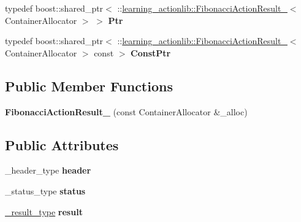 \begin{DoxyCompactItemize}
typedef boost\+::shared\+\_\+ptr$<$ \+::\hyperlink{structlearning__actionlib_1_1FibonacciActionResult__}{learning\+\_\+actionlib\+::\+Fibonacci\+Action\+Result\+\_\+}$<$ Container\+Allocator $>$ $>$ {\bfseries Ptr}
\item 
\mbox{\label{structlearning__actionlib_1_1FibonacciActionResult___a6a86dfac35aa197b56c238955b892621}} 
typedef boost\+::shared\+\_\+ptr$<$ \+::\hyperlink{structlearning__actionlib_1_1FibonacciActionResult__}{learning\+\_\+actionlib\+::\+Fibonacci\+Action\+Result\+\_\+}$<$ Container\+Allocator $>$ const  $>$ {\bfseries Const\+Ptr}
\end{DoxyCompactItemize}
\subsection*{Public Member Functions}
\begin{DoxyCompactItemize}
\item 
\mbox{\label{structlearning__actionlib_1_1FibonacciActionResult___a06ed56bbc335dc5bb0914ac327556acf}} 
{\bfseries Fibonacci\+Action\+Result\+\_\+} (const Container\+Allocator \&\+\_\+alloc)
\end{DoxyCompactItemize}
\subsection*{Public Attributes}
\begin{DoxyCompactItemize}
\item 
\mbox{\label{structlearning__actionlib_1_1FibonacciActionResult___a6ac80a06e53867571c95cd8e5402536f}} 
\+\_\+header\+\_\+type {\bfseries header}
\item 
\mbox{\label{structlearning__actionlib_1_1FibonacciActionResult___a7f5c684ce49d03331262f4661c52f2fc}} 
\+\_\+status\+\_\+type {\bfseries status}
\item 
\mbox{\label{structlearning__actionlib_1_1FibonacciActionResult___a56cd03cd99e9e5c837cab81982d07f95}} 
\hyperlink{structlearning__actionlib_1_1FibonacciResult__}{\+\_\+result\+\_\+type} {\bfseries result}
\end{DoxyCompactItemize}


